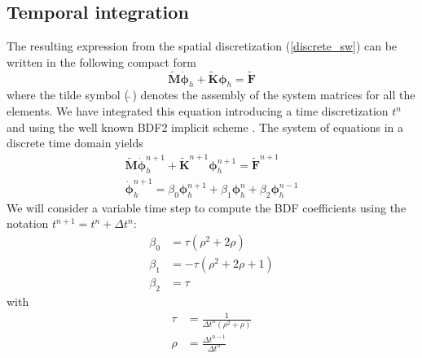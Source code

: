 \documentclass[a4paper,12pt]{article}
\begin{document}
\subsection{Temporal integration}

The resulting expression from the spatial discretization (\ref{discrete_sw}) can be written in the following compact form 
\begin{equation} \label{discrete_compact}
\tilde{\mathbf{M}}\dot{\bm{\phi}}_h + \tilde{\mathbf{K}}\bm{\phi}_h = \tilde{\mathbf{F}}
\end{equation}
where the tilde symbol ($\,\tilde{}\,$) denotes the assembly of the system matrices for all the elements.
We have integrated this equation introducing a time discretization $t^n$ and using the well known BDF2 implicit scheme \cite{curtiss1952,brayton1972}. The system of equations in a discrete time domain yields
\begin{equation}
\begin{split} \label{discrete_bdf2}
\tilde{\mathbf{M}}\dot{\bm{\phi}}_h^{n+1} + \tilde{\mathbf{K}}^{n+1}\bm{\phi}_h^{n+1} = \tilde{\mathbf{F}}^{n+1} \\
\dot{\bm{\phi}}_h^{n+1} = \beta_0 \bm{\phi}_h^{n+1} + \beta_1 \bm{\phi}_h^n + \beta_2 \bm{\phi}_h^{n-1}
\end{split}
\end{equation}
We will consider a variable time step to compute the BDF coefficients using the notation $t^{n+1} = t^n + \Delta t^n$:
\begin{equation}
\begin{split}
\beta_0 &= \tau (\rho^2 + 2\rho) \\
\beta_1 &= -\tau (\rho^2 + 2\rho + 1) \\
\beta_2 &= \tau
\end{split}
\end{equation}
with
\begin{equation}
\begin{split}
\tau &= \frac{1}{\Delta t^n(\rho^2 + \rho)} \\
\rho &= \frac{\Delta t^{n-1}}{\Delta t^n}
\end{split}
\end{equation}
\end{document}
